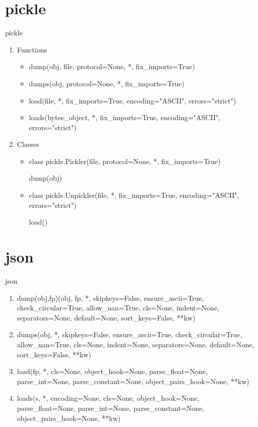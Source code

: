 \documentclass[xcolor=table]{mysld}
\begin{document}
\section{pickle}
\begin{frame}{pickle}
\begin{enumerate}
\item Functions
\begin{itemize}
\item dump(obj, file, protocol=None, *, fix\_imports=True)
\item dumps(obj, protocol=None, *, fix\_imports=True)
\item load(file, *, fix\_imports=True, encoding="ASCII", errors="strict") 
\item loads(bytes\_object, *, fix\_imports=True, encoding="ASCII", errors="strict") 
\end{itemize}
\item Classes
\begin{itemize}
\item class pickle.Pickler(file, protocol=None, *, fix\_imports=True)

dump(obj)
\item class pickle.Unpickler(file, *, fix\_imports=True, encoding="ASCII", errors="strict")

load()
\end{itemize}
\end{enumerate}
\end{frame}

\section{json}
\begin{frame}{json}
\begin{enumerate}
\item dump(obj,fp)(obj, fp, *, skipkeys=False, ensure\_ascii=True, check\_circular=True, allow\_nan=True, cls=None, indent=None, separators=None, default=None, sort\_keys=False, **kw) 
\item dumps(obj, *, skipkeys=False, ensure\_ascii=True, check\_circular=True, allow\_nan=True, cls=None, indent=None, separators=None, default=None, sort\_keys=False, **kw) 
\item load(fp, *, cls=None, object\_hook=None, parse\_float=None, parse\_int=None, parse\_constant=None, object\_pairs\_hook=None, **kw)
\item loads(s, *, encoding=None, cls=None, object\_hook=None, parse\_float=None, parse\_int=None, parse\_constant=None, object\_pairs\_hook=None, **kw)
\end{enumerate}
\end{frame}
\end{document}
